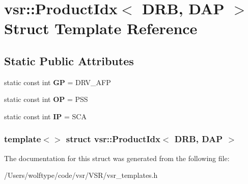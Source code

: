 \hypertarget{structvsr_1_1_product_idx_3_01_d_r_b_00_01_d_a_p_01_4}{\section{vsr\-:\-:Product\-Idx$<$ D\-R\-B, D\-A\-P $>$ Struct Template Reference}
\label{structvsr_1_1_product_idx_3_01_d_r_b_00_01_d_a_p_01_4}
}
\subsection*{Static Public Attributes}
\begin{DoxyCompactItemize}
\item 
\hypertarget{structvsr_1_1_product_idx_3_01_d_r_b_00_01_d_a_p_01_4_a2eb8e9891af1a51e7416a6d70b3f29c9}{static const int {\bfseries G\-P} = D\-R\-V\-\_\-\-A\-F\-P}\label{structvsr_1_1_product_idx_3_01_d_r_b_00_01_d_a_p_01_4_a2eb8e9891af1a51e7416a6d70b3f29c9}

\item 
\hypertarget{structvsr_1_1_product_idx_3_01_d_r_b_00_01_d_a_p_01_4_a6e164b342ab619dbe809925ebefab3b0}{static const int {\bfseries O\-P} = P\-S\-S}\label{structvsr_1_1_product_idx_3_01_d_r_b_00_01_d_a_p_01_4_a6e164b342ab619dbe809925ebefab3b0}

\item 
\hypertarget{structvsr_1_1_product_idx_3_01_d_r_b_00_01_d_a_p_01_4_ae80d64685f3e81f4d5e5890726357dc7}{static const int {\bfseries I\-P} = S\-C\-A}\label{structvsr_1_1_product_idx_3_01_d_r_b_00_01_d_a_p_01_4_ae80d64685f3e81f4d5e5890726357dc7}

\end{DoxyCompactItemize}
\subsubsection*{template$<$$>$ struct vsr\-::\-Product\-Idx$<$ D\-R\-B, D\-A\-P $>$}



The documentation for this struct was generated from the following file\-:\begin{DoxyCompactItemize}
\item 
/\-Users/wolftype/code/vsr/\-V\-S\-R/vsr\-\_\-templates.\-h\end{DoxyCompactItemize}
